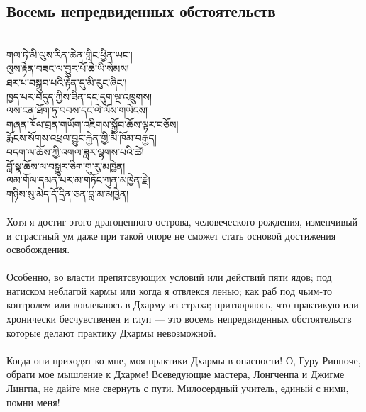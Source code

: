 \subsection*{Восемь непредвиденных обстоятельств}
\\
\ti
གལ་ཏེ་མི་ལུས་རིན་ཆེན་གླིང་ཕྱིན་ཡང༌།\\
ལུས་རྟེན་བཟང་ལ་བྱུར་པོ་ཆེ་ཡི་སེམས། \\
ཐར་པ་བསྒྲུབ་པའི་རྟེན་དུ་མི་རུང་ཞིང༌། \\
ཁྱད་པར་བདུད་ཀྱིས་ཟིན་དང་དུག་ལྔ་འཁྲུགས། \\
ལས་ངན་ཐོག་ཏུ་བབས་དང་ལེ་ལོས་གཡེངས། \\
གཞན་ཁོལ་བྲན་གཡོག་འཇིགས་སྐྱོབ་ཆོས་ལྟར་བཅོས། \\
རྨོངས་སོགས་འཕྲལ་བྱུང་རྐྱེན་གྱི་མི་ཁོམ་བརྒྱད། \\
བདག་ལ་ཆོས་ཀྱི་འགལ་ཟླར་ལྷགས་པའི་ཚེ། \\
བློ་སྣ་ཆོས་ལ་བསྒྱུར་ཅིག་གུ་རུ་མཁྱེན། \\
ལམ་གོལ་དམན་པར་མ་གཏོང་ཀུན་མཁྱེན་རྗེ། \\
གཉིས་སུ་མེད་དོ་དྲིན་ཅན་བླ་མ་མཁྱེན། \\
\\
\ru
\noindent Хотя я достиг этого драгоценного острова, человеческого рождения,
изменчивый и страстный ум даже при такой опоре не сможет стать основой достижения освобождения.\\
\\
Особенно, во власти препятсвующих условий или действий пяти ядов;
под натиском неблагой кармы или когда я отвлекся ленью;
как раб под чьим-то контролем или вовлекаюсь в Дхарму из страха;
притворяюсь, что практикую или хронически бесчувственен и глуп
— это восемь непредвиденных обстоятельств которые
делают практику Дхармы невозможной.\\
\\
Когда они приходят ко мне, моя практики Дхармы в опасности!
О, Гуру Ринпоче, обрати мое мышление к Дхарме!
Всеведующие мастера, Лонгченпа и Джигме Лингпа,
не дайте мне свернуть с пути.
Милосердный учитель, единый с ними, помни меня!

\newpage
